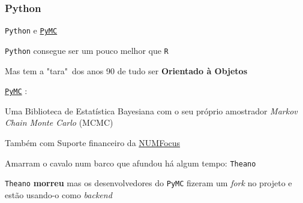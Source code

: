 \subsubsection{Python}
\begin{frame}{\texttt{Python} e \href{http://docs.pymc.io/}{\texttt{PyMC}}}
    \begin{vfilleditems}
        \item \texttt{Python} consegue ser um pouco melhor que \texttt{R}
        \item Mas tem a "tara"~dos anos 90 de tudo ser \textbf{Orientado à Objetos}
        \item \href{http://docs.pymc.io/}{\texttt{PyMC}} \parencite{pymc3}:
        \begin{vfilleditems}
            \item Uma Biblioteca de Estatística Bayesiana com o seu próprio amostrador \textit{Markov Chain Monte Carlo} (MCMC)
            \item Também com Suporte financeiro da \href{https://numfocus.org/}{NUMFocus}
            \item Amarram o cavalo num barco que afundou há algum tempo: \texttt{Theano}
            \item \texttt{Theano} \textbf{morreu} mas os desenvolvedores do \texttt{PyMC} fizeram um \textit{fork} no projeto e estão usando-o como \textit{backend}
        \end{vfilleditems}
    \end{vfilleditems}
\end{frame}



